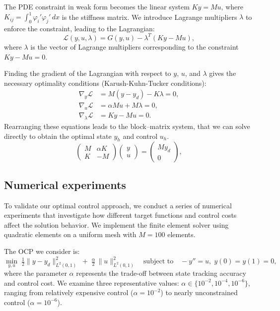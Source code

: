 \documentclass[a4paper,10pt]{article}
\begin{document}
The PDE constraint in weak form becomes the linear system $Ky = Mu$, where $K_{ij}=\int_0^1 \varphi_i'\varphi_j'\,dx$ is the stiffness matrix.
We introduce Lagrange multipliers $\lambda$ to enforce the constraint, leading to the Lagrangian:
\[
	\mathcal{L}(y,u,\lambda) = G(y,u) - \lambda^T(Ky - Mu),
\]
where $\lambda$ is the vector of Lagrange multipliers corresponding to the constraint $Ky - Mu = 0$.

Finding the gradient of the Lagrangian with respect to $y$, $u$, and $\lambda$ gives the necessary optimality conditions (Karush-Kuhn-Tucker conditions):
\begin{align*}
	\nabla_y \mathcal{L}       & = M(y-y_d) - K\lambda = 0,  \\
	\nabla_u \mathcal{L}       & = \alpha Mu + M\lambda = 0, \\
	\nabla_\lambda \mathcal{L} & = Ky - Mu = 0.
\end{align*}
Rearranging these equations leads to the block--matrix system, that we can solve directly to obtain the optimal state $y_h$ and control $u_h$.
\[
	\begin{pmatrix}
		M & \alpha K \\
		K & -M
	\end{pmatrix}
	\begin{pmatrix}
		y \\
		u
	\end{pmatrix}
	=
	\begin{pmatrix}
		My_d \\
		0
	\end{pmatrix}, 
\]

\subsection{Numerical experiments}
\label{sec:numericalOCP}
To validate our optimal control approach, we conduct a series of numerical experiments that investigate how different target functions and control costs affect the solution behavior. We implement the finite element solver using quadratic elements on a uniform mesh with $M=100$ elements.

The OCP we consider is:
\[
	\min_{y,u} \; \tfrac12 \|y - y_d\|_{L^2(0,1)}^2 \;+\; \tfrac{\alpha}{2}\,\|u\|_{L^2(0,1)}^2
	\quad \text{subject to} \quad
	-y'' = u,\; y(0)=y(1)=0,
\]
where the parameter $\alpha$ represents the trade-off between state tracking accuracy and control cost. We examine three representative values: $\alpha \in \{10^{-2}, 10^{-4}, 10^{-6}\}$, ranging from relatively expensive control ($\alpha=10^{-2}$) to nearly unconstrained control ($\alpha=10^{-6}$).
\end{document}
